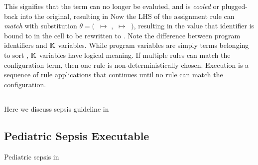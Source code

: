 This signifies that the term can no longer be evaluted, and is \emph{cooled}
or plugged-back into the original, resulting in 
Now the LHS of the assignment rule can \emph{match} with substitution $\theta =
($\ $ \mapsto $ $,$  $\mapsto\ $ $)$, resulting in the value that identifier 
is bound to in the  cell to be rewritten to .
Note the difference between program identifiers and $\mathbb{K}$ variables. While
program variables are simply terms belonging to sort ,
$\mathbb{K}$ variables have logical meaning. If multiple rules can match
the configuration term, then one rule is non-deterministically chosen.
Execution is a sequence of rule applications that continues until no
rule can match the configuration.

\subsection{\MediK{}}\label{subsec:medik}
Here we discuss sepsis guideline in \MediK{}


\subsection{Pediatric Sepsis Executable \BPG{}}\label{subsec:sepsis-cdss}
Pediatric sepsis \CDSS{} in \MediK{}


